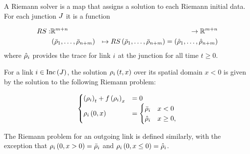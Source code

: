 \begin{defn}
A Riemann solver is a map that assigns a solution to each Riemann initial data. For each junction $J$ it is a function

\begin{eqnarray*}
RS: & \mathbb{R}^{m+n} & \rightarrow\mathbb{R}^{m+n}\\
 & \left(\bar{\rho}_{1},\ldots,\bar{\rho}_{n+m}\right) & \mapsto RS\left(\bar{\rho}_{1},\ldots,\bar{\rho}_{n+m}\right)=\left(\hat{\rho}_{1},\ldots,\hat{\rho}_{n+m}\right)
\end{eqnarray*}
where $\hat{\rho}_{i}$ provides the trace for link $i$
at the junction for all time $t\ge0$.

\end{defn}
For a link $i\in\text{Inc}\left(J\right)$,
the solution $\rho_{i}\left(t,x\right)$ over its spatial domain
$x<0$ is given by the solution to the following Riemann problem:

\begin{equation}
\begin{cases}
\left(\rho_{i}\right)_{t}+f\left(\rho_{i}\right)_{x} & =0\\
\rho_{i}\left(0,x\right) & =\begin{cases}
\bar{\rho}_{i} & x<0\\
\hat{\rho}_{i} & x\ge0,
\end{cases}
\end{cases}\label{eq:riemann-problem}
\end{equation}

The Riemann problem for an outgoing link is defined similarly, with
the exception that $\rho_{i}\left(0,x>0\right)=\bar{\rho}_{i}$
and $\rho_{i}\left(0,x\le0\right)=\hat{\rho}_{i}$. 






